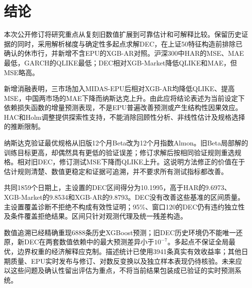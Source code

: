 \section*{结论}
本次公开修订将研究重点从复刻旧数值扩展到可靠估计和可解释比较。保留历史证据的同时，采用解析梯度与确定性多起点求解DEC，在上证50特征构造前排除已确认的休市行，并新增不含EPU的XGB-AR对照。沪深300中HAR的MSE、MAE最低，GARCH的QLIKE最低；DEC相对XGB-Market降低QLIKE和MAE，但MSE略高。

新增消融表明，三市场加入MIDAS-EPU后相对XGB-AR均降低QLIKE、提高MSE，中国两市场的MAE下降而纳斯达克上升。由此应将结论表述为当前设定下依赖损失函数的增量预测表现，不是EPU普遍改善预测或产生结构性因果效应。HAC和Holm调整提供探索性支持，不能消除回顾性分析、非线性估计及规格选择的推断限制。

纳斯达克验证最优规格从旧版12个月Beta改为12个月指数Almon。旧Beta局部解的训练目标更高，却偶然具有更低的验证误差；修订求解后按相同验证规则重选规格。相对旧DEC，修订测试MSE下降而QLIKE上升。这说明方法修正的价值在于估计规则清楚、数值更稳定和证据可追溯，并不要求所有测试指标都改善。

共同1859个日期上，主设置的DEC区间得分为10.1995，高于HAR的9.6973、XGB-Market的9.8534和XGB-AR的9.8793。DEC没有改善这些基准的区间质量。主设置覆盖诊断不拒绝不构成有效性证明；95\%、窗口120的DEC仍有违约独立性及条件覆盖拒绝结果。区间只针对观测代理及统一残差构造。

数值追溯已经精确重现6888条历史XGBoost预测；旧DEC历史环境仍不能唯一还原，新DEC在两套数值依赖中的最大预测差异小于$10^{-7}$。多起点不保证全局最优，边界权重的经济解释应克制。描述统计已使用3941条真实有效收益率；其他日期质量、EPU实时发布与修订、对数反变换以及独立样本表现仍待核验。未来应以这些问题及确认性留出评估为重点，不将当前结果包装成已验证的实时预测系统。
